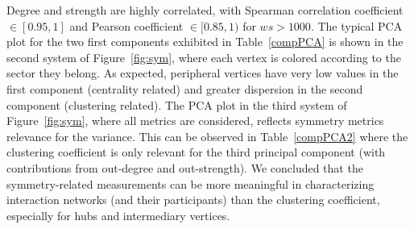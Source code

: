 \documentclass[%
 aip,
 jmp,%
 amsmath,amssymb,
 reprint,%
]{revtex4-1}
\begin{document}
Degree and strength are highly correlated, with Spearman correlation coefficient $\in [0.95,1]$ and Pearson coefficient $\in [0.85,1)$ for $ws>1000$. The typical PCA plot for the two first components exhibited in Table~\ref{compPCA} is shown in the second system of Figure~\ref{fig:sym}, where each vertex is colored according to the sector they belong. As expected, peripheral vertices have very low values in the first component (centrality related) and greater dispersion in the second component (clustering related).
The PCA plot in the third system of Figure~\ref{fig:sym}, where all metrics are considered, reflects symmetry metrics relevance for the variance. 
This can be observed in Table~\ref{compPCA2} where the clustering coefficient is only relevant for the third principal component (with contributions from out-degree and out-strength). 
We concluded that the symmetry-related measurements can be more meaningful in characterizing interaction networks (and their participants) than the clustering coefficient, especially for hubs and intermediary vertices.

\end{document}
